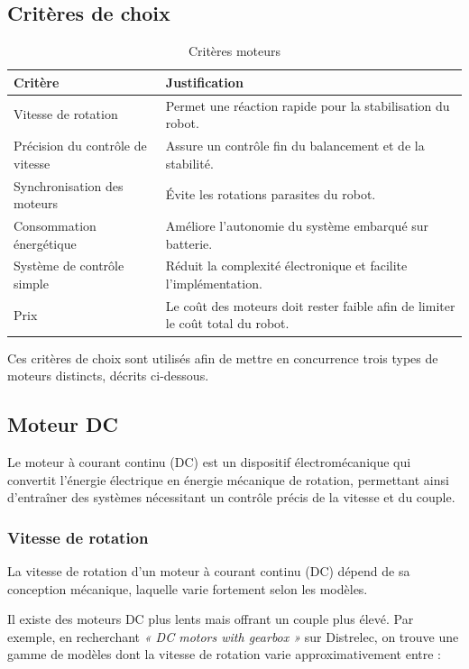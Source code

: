 \subsection{Critères de choix}
\begin{table}[H]
    \centering
    \begin{tabular}{|l|p{8cm}|}
        \hline
        \textbf{Critère} & \textbf{Justification} \\
        \hline
        Vitesse de rotation & Permet une réaction rapide pour la stabilisation du robot. \\
        \hline
        Précision du contrôle de vitesse & Assure un contrôle fin du balancement et de la stabilité. \\
        \hline
        Synchronisation des moteurs & Évite les rotations parasites du robot. \\
        \hline
        Consommation énergétique & Améliore l'autonomie du système embarqué sur batterie. \\
        \hline
        Système de contrôle simple & Réduit la complexité électronique et facilite l'implémentation. \\
        \hline
        Prix & Le coût des moteurs doit rester faible afin de limiter le coût total du robot. \\
        \hline
    \end{tabular}
    \caption{Critères moteurs}
    \label{tab:criteres_moteurs}
\end{table}
Ces critères de choix sont utilisés afin de mettre en concurrence trois types de moteurs distincts, décrits ci-dessous.
\subsection{Moteur DC}
Le moteur à courant continu (DC) est un dispositif électromécanique qui convertit l'énergie électrique en énergie mécanique de rotation, permettant ainsi d'entraîner des systèmes nécessitant un contrôle précis de la vitesse et du couple.\subsubsection{Vitesse de rotation}

La vitesse de rotation d'un moteur à courant continu (DC) dépend de sa conception mécanique, laquelle varie fortement selon les modèles.

Il existe des moteurs DC plus lents mais offrant un couple plus élevé. Par exemple, en recherchant \textit{« DC motors with gearbox »} sur Distrelec, on trouve une gamme de modèles dont la vitesse de rotation varie approximativement entre :

